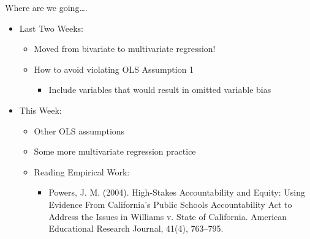 \documentclass[
  8pt,
  ignorenonframetext,
  dvipsnames]{beamer}
\providecommand{\tightlist}{%
  \setlength{\itemsep}{0pt}\setlength{\parskip}{0pt}}
\let\olditem\item
\renewcommand{\item}{%
  \olditem\vspace{4pt}
}
\begin{document}
\begin{frame}{Where are we going\ldots.}
\protect\hypertarget{where-are-we-going.}{}

\begin{itemize}
\tightlist
\item
  Last Two Weeks:

  \begin{itemize}
  \tightlist
  \item
    Moved from bivariate to multivariate regression!
  \item
    How to avoid violating OLS Assumption 1

    \begin{itemize}
    \tightlist
    \item
      Include variables that would result in omitted variable bias
    \end{itemize}
  \end{itemize}
\end{itemize}

\medskip

\begin{itemize}
\tightlist
\item
  This Week:

  \begin{itemize}
  \tightlist
  \item
    Other OLS assumptions
  \item
    Some more multivariate regression practice
  \item
    Reading Empirical Work:

    \begin{itemize}
    \tightlist
    \item
      Powers, J. M. (2004). High-Stakes Accountability and Equity: Using
      Evidence From California's Public Schools Accountability Act to
      Address the Issues in Williams v. State of California. American
      Educational Research Journal, 41(4), 763--795.
    \end{itemize}
  \end{itemize}
\end{itemize}

\end{frame}
\end{document}
